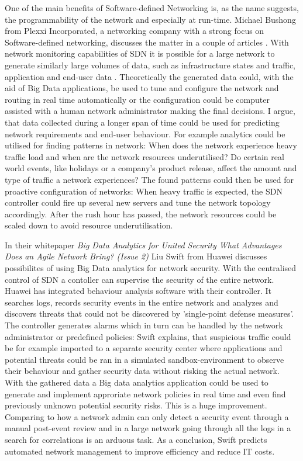 \documentclass{acm_proc_article-sp}
\begin{document}
One of the main benefits of Software-defined Networking is, as the name suggests, the programmability of the network and especially at run-time. Michael Bushong from Plexxi Incorporated, a networking company with a strong focus on Software-defined networking, discusses the matter in a couple of articles \cite{Bushong2013, Bushong2013-2}. With network monitoring capabilities of SDN it is possible for a large network to generate similarly large volumes of data, such as infrastructure states and traffic, application and end-user data \cite{Bushong2013}. Theoretically the generated data could, with the aid of Big Data applications, be used to tune and configure the network and routing in real time automatically or the configuration could be computer assisted with a human network administrator making the final decisions. I argue, that data collected during a longer span of time could be used for predicting network requirements and end-user behaviour. For example analytics could be utilised for finding patterns in network: When does the network experience heavy traffic load and when are the network resources underutilised? Do certain real world events, like holidays or a company's product release, affect the amount and type of traffic a network experiences? The found patterns could then be used for proactive configuration of networks: When heavy traffic is expected, the SDN controller could fire up several new servers and tune the network topology accordingly. After the rush hour has passed, the network resources could be scaled down to avoid resource underutilisation.

In their whitepaper \textit{Big Data Analytics for United Security \textendash What Advantages Does an Agile Network Bring? (Issue 2)} \cite{Liu2014} Liu Swift from Huawei discusses possibilites of using Big Data analytics for network security. With the centralised control of SDN a contoller can supervise the security of the entire network. Huawei has integrated behaviour analysis software with their controller. It searches logs, records security events in the entire network and analyzes and discovers threats that could not be discovered by 'single-point defense measures'. The controller generates alarms which in turn can be handled by the network administrator or predefined policies: Swift explains, that suspicious traffic could be for example imported to a separate security center where applications and potential threats could be ran in a simulated sandbox-environment to observe their behaviour and gather security data without risking the actual network. With the gathered data a Big data analytics application could be used to generate and implement approriate network policies in real time and even find previously unknown potential security risks. This is a huge improvement. Comparing to how a network admin can only detect a security event through a manual post-event review and in a large network going through all the logs in a search for correlations is an arduous task. As a conclusion, Swift predicts automated network management to improve efficiency and reduce IT costs. 
\end{document}
